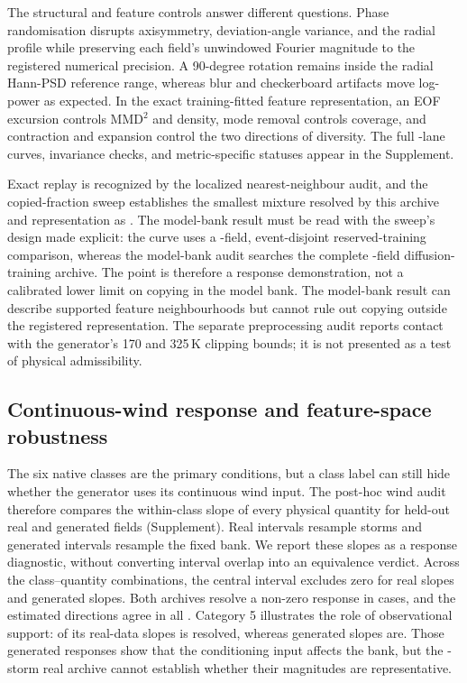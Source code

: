 \documentclass[gmd, manuscript]{copernicus}
\begin{document}
The structural and feature controls answer different questions. Phase randomisation
disrupts axisymmetry, deviation-angle variance, and the radial profile while
preserving each field's unwindowed Fourier magnitude to the registered numerical
precision. A 90-degree rotation remains inside the radial Hann-PSD reference range,
whereas blur and checkerboard artifacts move log-power as expected. In the exact
training-fitted feature representation, an EOF excursion controls MMD\({}^2\) and
density, mode removal controls coverage, and contraction and expansion control the
two directions of diversity. The full \ControlLaneCount-lane curves, invariance
checks, and metric-specific statuses appear in the Supplement.

Exact replay is recognized by the localized nearest-neighbour audit, and the
copied-fraction sweep establishes the smallest mixture resolved by this archive and
representation as \MinimumResolvedCopyFraction{}. The model-bank result must be read
with the sweep's design made explicit: the curve uses a
\ControlReferenceFields-field, event-disjoint
reserved-training comparison, whereas the model-bank audit searches the complete
\MemorizationTrainingFields-field diffusion-training archive. The
\MinimumResolvedCopyFraction{} point is therefore a response
demonstration, not a calibrated lower limit on copying in the model bank. The
model-bank result can describe supported feature neighbourhoods but cannot rule out
copying outside the registered representation. The separate preprocessing audit reports contact with the
generator's 170 and 325\,K clipping bounds; it is not presented as a test of physical
admissibility.

\subsection{Continuous-wind response and feature-space robustness}

The six native classes are the primary conditions, but a class label can still hide
whether the generator uses its continuous wind input. The post-hoc wind audit
therefore compares the within-class slope of every physical quantity for held-out
real and generated fields (Supplement). Real intervals resample storms and generated
intervals resample the fixed bank. We report these slopes as a response diagnostic,
without converting interval overlap into an equivalence verdict. Across the
\WindSlopeComparisons{} class--quantity combinations, the central interval excludes
zero for \WindRealResolved{} real slopes and \WindGeneratedResolved{} generated
slopes. Both archives resolve a non-zero response in \WindBothResolved{} cases, and
the estimated directions agree in all \WindBothSameSign{}. Category 5 illustrates
the role of observational support: \WindCfiveRealResolved{} of its real-data slopes
is resolved, whereas
\WindCfiveGeneratedResolved{} generated slopes are. Those generated responses show
that the conditioning input affects the bank, but the \CfiveStorms-storm real archive cannot
establish whether their magnitudes are representative.
\end{document}
